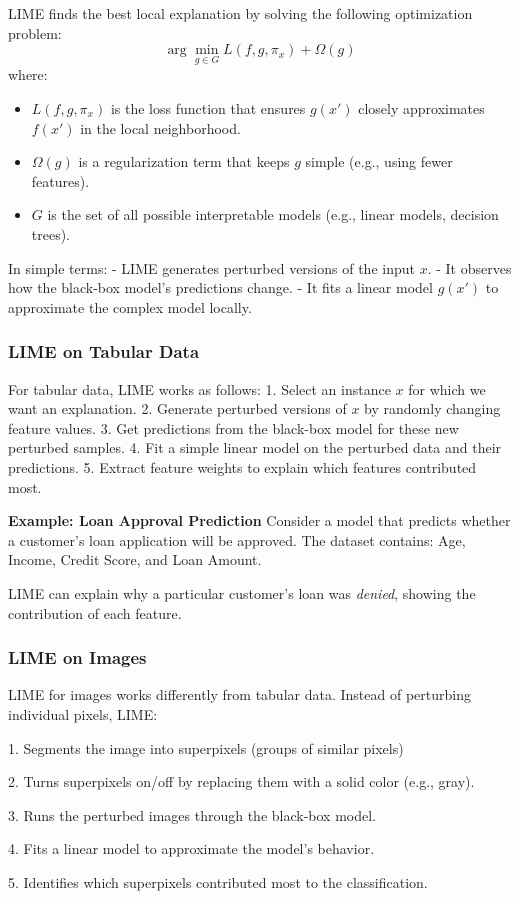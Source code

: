 LIME finds the best local explanation by solving the following optimization problem:
\begin{equation}
    \arg \min_{g \in G} L(f, g, \pi_x) + \Omega(g)
\end{equation}
where:
\begin{itemize}
    \item \( L(f, g, \pi_x) \) is the loss function that ensures \( g(x') \) closely approximates \( f(x') \) in the local neighborhood.
    \item \( \Omega(g) \) is a regularization term that keeps \( g \) simple (e.g., using fewer features).
    \item \( G \) is the set of all possible interpretable models (e.g., linear models, decision trees).
\end{itemize}

In simple terms:
- LIME generates perturbed versions of the input \( x \).
- It observes how the black-box model's predictions change.
- It fits a linear model \( g(x') \) to approximate the complex model locally.

\subsubsection{LIME on Tabular Data}
For tabular data, LIME works as follows:
1. Select an instance \( x \) for which we want an explanation.
2. Generate perturbed versions of \( x \) by randomly changing feature values.
3. Get predictions from the black-box model for these new perturbed samples.
4. Fit a simple linear model on the perturbed data and their predictions.
5. Extract feature weights to explain which features contributed most.

\textbf{Example: Loan Approval Prediction}
Consider a model that predicts whether a customer’s loan application will be approved. The dataset contains: Age, Income, Credit Score, and Loan Amount.


LIME can explain why a particular customer’s loan was \textit{denied}, showing the contribution of each feature.

\subsubsection{LIME on Images}
LIME for images works differently from tabular data. Instead of perturbing individual pixels, LIME:
\begin{description}
    \item 1. Segments the image into superpixels (groups of similar pixels)
    \item 2. Turns superpixels on/off by replacing them with a solid color (e.g., gray).
    \item 3. Runs the perturbed images through the black-box model.
    \item 4. Fits a linear model to approximate the model's behavior.
    \item 5. Identifies which superpixels contributed most to the classification.
\end{description}


